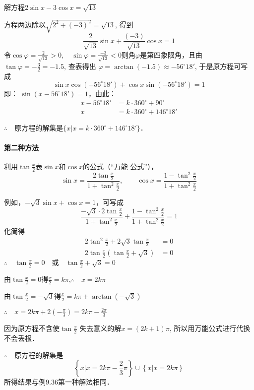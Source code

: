 \begin{example}
    解方程$2\sin x-3\cos x =\sqrt{13}$
\end{example}

\begin{solution}
方程两边除以$\sqrt{2^2+(-3)^2}=\sqrt{13}$, 得到
\[\frac{2}{\sqrt{13}}\sin x+\frac{(-3)}{\sqrt{13}}\cos x=1\]
令$\cos\varphi=\frac{2}{\sqrt{13}}>0,\quad \sin\varphi=\frac{-3}{\sqrt{13}}<0$则角$\varphi$是第四象限角，且由$\tan \varphi=-\frac{3}{2}=-1.5$, 查表得出
$\varphi=\arctan (-1.5)\approx -56^{\circ}18'$, 于是原方程可写成
\[\sin x\cos(-56^{\circ}18')+\cos x\sin(-56^{\circ}18')=1\]
即：
$\sin(x-56^{\circ}18')=1$，由此：
\[\begin{split}
   x- 56^{\circ}18'&=k\cdot 360^{\circ}+90^{\circ}\\
x&=k\cdot 360^{\circ}+146^{\circ}18'
\end{split}\]

$\therefore\quad $原方程的解集是$\{x\big|x=k\cdot 360^{\circ}+146^{\circ}18'\}$．
\end{solution}

\paragraph{第二种方法} 
利用$\tan\frac{x}{2}$表$\sin x$和$\cos x$的公式（“万能
公式”），
\[\sin x=\frac{2\tan\frac{x}{2}}{1+\tan^2\frac{x}{2}},\qquad \cos x=\frac{1-\tan^2\frac{x}{2}}{1+\tan^2\frac{x}{2}}\]

例如，$-\sqrt{3}\sin x+\cos x=1 $，可写成
\[\frac{-\sqrt{3}\cdot 2\tan\frac{x}{2}}{1+\tan^2\frac{x}{2}}+\frac{1-\tan^2\frac{x}{2}}{1+\tan^2\frac{x}{2}}=1\]
化简得
\[\begin{split}
    2\tan^2\frac{x}{2}+2\sqrt{3}\tan\frac{x}{2}&=0\\
    2\tan\frac{x}{2}\left(\tan\frac{x}{2}+\sqrt{3}\right)&=0
\end{split} 
   \]
$\therefore\quad \tan\frac{x}{2}=0\quad \text{或}\quad \tan\frac{x}{2}+\sqrt{3}=0$

由$\tan\frac{x}{2}=0$得$\frac{x}{2}=k\pi$,\quad $\therefore\quad x=2k\pi$

由$\tan\frac{x}{2}=-\sqrt{3}$得$\frac{x}{2}=k\pi+\arctan(-\sqrt{3})$

$\therefore\quad x=2k\pi+2\left(-\frac{\pi}{3}\right)=2k\pi-\frac{2\pi}{3}$

因为原方程不含使$\tan\frac{x}{2}$
失去意义的解$x=(2k+1)\pi$, 所以用万能公式进行代换不会丢根．

$\therefore\quad $原方程的解集是
\[\left\{x\big|x=2k\pi-\frac{2}{3}\pi\right\}\cup \left\{x\big|x=2k\pi\right\}\]
所得结果与例9.36第一种解法相同．

